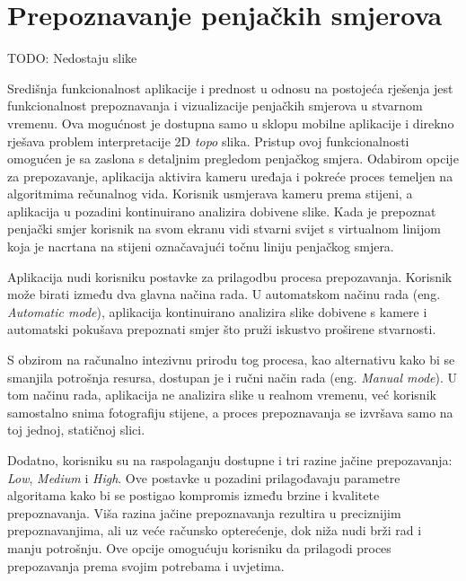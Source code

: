 \section{Prepoznavanje penjačkih smjerova}

TODO: Nedostaju slike

Središnja funkcionalnost aplikacije i prednost u odnosu na postojeća rješenja jest funkcionalnost prepoznavanja i vizualizacije penjačkih smjerova u stvarnom vremenu. Ova mogućnost je dostupna samo u sklopu mobilne aplikacije i direkno rješava problem interpretacije 2D \textit{topo} slika. Pristup ovoj funkcionalnosti omogućen je sa zaslona s detaljnim pregledom penjačkog smjera. Odabirom opcije za prepozavanje, aplikacija aktivira kameru uređaja i pokreće proces temeljen na algoritmima rečunalnog vida. Korisnik usmjerava kameru prema stijeni, a aplikacija u pozadini kontinuirano analizira dobivene slike. Kada je prepoznat penjački smjer korisnik na svom ekranu vidi stvarni svijet s virtualnom linijom koja je nacrtana na stijeni označavajući točnu liniju penjačkog smjera.

Aplikacija nudi korisniku postavke za prilagodbu procesa prepozavanja. Korisnik može birati između dva glavna načina rada. U automatskom načinu rada (eng. \textit{Automatic mode}), aplikacija kontinuirano analizira slike dobivene s kamere i automatski pokušava prepoznati smjer što pruži iskustvo proširene stvarnosti. 

S obzirom na računalno intezivnu prirodu tog procesa, kao alternativu kako bi se smanjila potrošnja resursa, dostupan je i ručni način rada (eng. \textit{Manual mode}). U tom načinu rada, aplikacija ne analizira slike u realnom vremenu, već korisnik samostalno snima fotografiju stijene, a proces prepoznavanja se izvršava samo na toj jednoj, statičnoj slici. 

Dodatno, korisniku su na raspolaganju dostupne i tri razine jačine prepozavanja: \textit{Low}, \textit{Medium} i \textit{High}. Ove postavke u pozadini prilagođavaju parametre algoritama kako bi se postigao kompromis između brzine i kvalitete prepoznavanja. Viša razina jačine prepoznavanja rezultira u preciznijim prepoznavanjima, ali uz veće računsko opterećenje, dok niža nudi brži rad i manju potrošnju. Ove opcije omogućuju korisniku da prilagodi proces prepozavanja prema svojim potrebama i uvjetima.